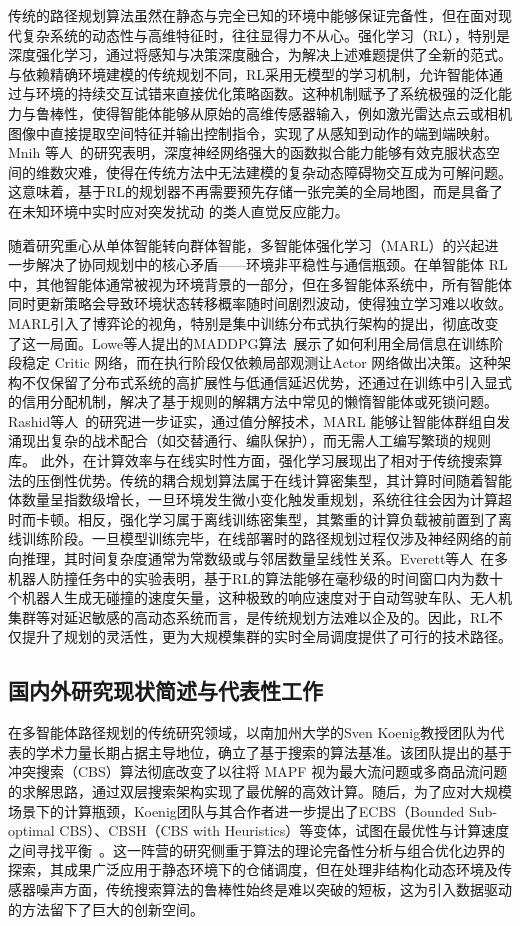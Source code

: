 \documentclass[13.5pt]{extarticle}
\begin{document}
传统的路径规划算法虽然在静态与完全已知的环境中能够保证完备性，但在面对现代复杂系统的动态性与高维特征时，往往显得力不从心。强化学习（RL），特别是深度强化学习，通过将感知与决策深度融合，为解决上述难题提供了全新的范式。与依赖精确环境建模的传统规划不同，RL采用无模型的学习机制，允许智能体通过与环境的持续交互试错来直接优化策略函数。这种机制赋予了系统极强的泛化能力与鲁棒性，使得智能体能够从原始的高维传感器输入，例如激光雷达点云或相机图像中直接提取空间特征并输出控制指令，实现了从感知到动作的端到端映射。Mnih 等人~\cite{mnih2015human}的研究表明，深度神经网络强大的函数拟合能力能够有效克服状态空间的维数灾难，使得在传统方法中无法建模的复杂动态障碍物交互成为可解问题。这意味着，基于RL的规划器不再需要预先存储一张完美的全局地图，而是具备了在未知环境中实时应对突发扰动  的类人直觉反应能力。

随着研究重心从单体智能转向群体智能，多智能体强化学习（MARL）的兴起进一步解决了协同规划中的核心矛盾——环境非平稳性与通信瓶颈。在单智能体 RL中，其他智能体通常被视为环境背景的一部分，但在多智能体系统中，所有智能体同时更新策略会导致环境状态转移概率随时间剧烈波动，使得独立学习难以收敛。MARL引入了博弈论的视角，特别是集中训练分布式执行架构的提出，彻底改变了这一局面。Lowe等人提出的MADDPG算法~\cite{lowe2017multi}展示了如何利用全局信息在训练阶段稳定 Critic 网络，而在执行阶段仅依赖局部观测让Actor 网络做出决策。这种架构不仅保留了分布式系统的高扩展性与低通信延迟优势，还通过在训练中引入显式的信用分配机制，解决了基于规则的解耦方法中常见的懒惰智能体或死锁问题。Rashid等人~\cite{rashid2018qmix}的研究进一步证实，通过值分解技术，MARL 能够让智能体群组自发涌现出复杂的战术配合（如交替通行、编队保护），而无需人工编写繁琐的规则库。
此外，在计算效率与在线实时性方面，强化学习展现出了相对于传统搜索算法的压倒性优势。传统的耦合规划算法属于在线计算密集型，其计算时间随着智能体数量呈指数级增长，一旦环境发生微小变化触发重规划，系统往往会因为计算超时而卡顿。相反，强化学习属于离线训练密集型，其繁重的计算负载被前置到了离线训练阶段。一旦模型训练完毕，在线部署时的路径规划过程仅涉及神经网络的前向推理，其时间复杂度通常为常数级或与邻居数量呈线性关系。Everett等人~\cite{everett2018motion}在多机器人防撞任务中的实验表明，基于RL的算法能够在毫秒级的时间窗口内为数十个机器人生成无碰撞的速度矢量，这种极致的响应速度对于自动驾驶车队、无人机集群等对延迟敏感的高动态系统而言，是传统规划方法难以企及的。因此，RL不仅提升了规划的灵活性，更为大规模集群的实时全局调度提供了可行的技术路径。
\subsection{国内外研究现状简述与代表性工作}
在多智能体路径规划的传统研究领域，以南加州大学的Sven Koenig教授团队为代表的学术力量长期占据主导地位，确立了基于搜索的算法基准。该团队提出的基于冲突搜索（CBS）算法彻底改变了以往将 MAPF 视为最大流问题或多商品流问题的求解思路，通过双层搜索架构实现了最优解的高效计算。随后，为了应对大规模场景下的计算瓶颈，Koenig团队与其合作者进一步提出了ECBS（Bounded Sub-optimal CBS）、CBSH（CBS with Heuristics）等变体，试图在最优性与计算速度之间寻找平衡~\cite{sharon2015conflict}。这一阵营的研究侧重于算法的理论完备性分析与组合优化边界的探索，其成果广泛应用于静态环境下的仓储调度，但在处理非结构化动态环境及传感器噪声方面，传统搜索算法的鲁棒性始终是难以突破的短板，这为引入数据驱动的方法留下了巨大的创新空间。
\end{document}
